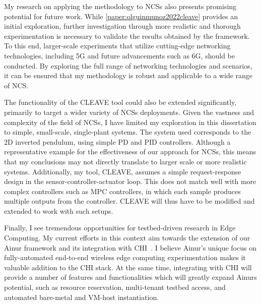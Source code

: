 My research on applying the methodology to \glspl{NCS} also presents promising potential for future work.
While \cref{paper:olguinmunoz2022cleave} provides an initial exploration, further investigation through more realistic and thorough experimentation is necessary to validate the results obtained by the framework.
To this end, larger-scale experiments that utilize cutting-edge networking technologies, including 5G and future advancements such as 6G, should be conducted.
By exploring the full range of networking technologies and scenarios, it can be ensured that my methodology is robust and applicable to a wide range of \gls{NCS}.

The functionality of the \gls{CLEAVE} tool could also be extended significantly, primarily to target a wider variety of \glspl{NCS} deployments.
Given the vastness and complexity of the field of \glspl{NCS}, I have limited my exploration in this dissertation to simple, small-scale, single-plant systems.
The system used corresponds to the \gls{2D} inverted pendulum, using simple \gls{PD} and \gls{PID} controllers.
Although a representative example for the effectiveness of our approach for \glspl{NCS}, this means that my conclusions may not directly translate to larger scale or more realistic systems.
Additionally, my tool, \gls{CLEAVE}, assumes a simple request-response design in the sensor-controller-actuator loop.
This does not match well with more complex controllers such as \gls{MPC} controllers, in which each sample produces multiple outputs from the controller.
\gls{CLEAVE} will thus have to be modified and extended to work with such setups.

Finally, I see tremendous opportunities for testbed-driven research in Edge Computing.
My current efforts in this context aim towards the extension of our Ainur framework and its integration with \gls{CHI}~\cite{keahey2020lessons}.
I believe Ainur's unique focus on fully-automated end-to-end wireless edge computing experimentation makes it valuable addition to the \gls{CHI} stack.
At the same time, integrating with \gls{CHI} will provide a number of features and functionalities which will greatly expand Ainurs potential, such as resource reservation, multi-tenant testbed access, and automated bare-metal and \gls{VM}-host instantiation.

